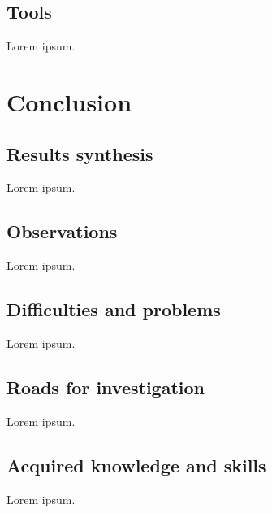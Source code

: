 \documentclass[12pt, a4paper]{report}
\begin{document}
		\section{Tools}
			Lorem ipsum.
	\chapter{Conclusion}
		\section{Results synthesis}
			Lorem ipsum.
		\section{Observations}
			Lorem ipsum.
		\section{Difficulties and problems}
			Lorem ipsum.
		\section{Roads for investigation}
			Lorem ipsum.
		\section{Acquired knowledge and skills}
			Lorem ipsum.
	
	
	\appendix
\end{document}
